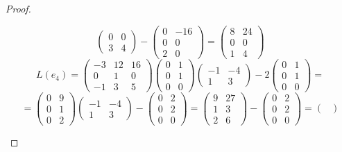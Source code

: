 \documentclass[11pt, fleqn]{article}
\begin{document}
\begin{proof}
\begin{enumerate}
\[\begin{pmatrix}
      0 & 0\\
      3 & 4
    \end{pmatrix} - \begin{pmatrix}
      0 & -16\\
      0 & 0\\
      2 & 0
    \end{pmatrix} = \begin{pmatrix}
      8 & 24\\
      0 & 0\\
      1 & 4
    \end{pmatrix}\]
    \[L(e_4) = \begin{pmatrix}
      -3 & 12 & 16\\
      0 & 1 & 0\\
      -1 & 3 & 5
    \end{pmatrix} \begin{pmatrix}
      0 & 1\\
      0 & 1\\
      0 & 0
    \end{pmatrix} \begin{pmatrix}
      -1 & -4\\
      1 & 3
    \end{pmatrix} - 2 \begin{pmatrix}
      0 & 1\\
      0 & 1\\
      0 & 0
    \end{pmatrix} =\]
    \[= \begin{pmatrix}
      0 & 9\\
      0 & 1\\
      0 & 2
    \end{pmatrix} \begin{pmatrix}
      -1 & -4\\
      1 & 3
    \end{pmatrix} - \begin{pmatrix}
      0 & 2\\
      0 & 2\\
      0 & 0
    \end{pmatrix} = \begin{pmatrix}
      9 & 27\\
      1 & 3\\
      2 & 6
    \end{pmatrix} - \begin{pmatrix}
      0 & 2\\
      0 & 2\\
      0 & 0
    \end{pmatrix} = \begin{pmatrix}

\end{pmatrix}\]
\end{enumerate}
\end{proof}
\end{document}
